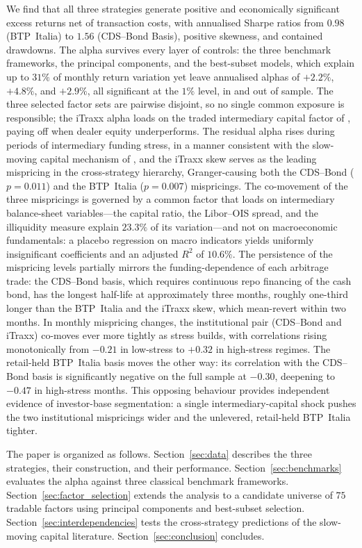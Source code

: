 We find that all three strategies generate positive and economically
significant excess returns net of transaction costs, with annualised
Sharpe ratios from $0.98$ (BTP~Italia) to $1.56$ (CDS--Bond Basis),
positive skewness, and contained drawdowns. The alpha survives every
layer of controls: the three benchmark frameworks, the principal
components, and the best-subset models, which explain up to $31\%$ of
monthly return variation yet leave annualised alphas of $+2.2\%$,
$+4.8\%$, and $+2.9\%$, all significant at the $1\%$ level, in and
out of sample. The three selected factor sets are pairwise disjoint,
so no single common exposure is responsible; the iTraxx alpha loads
on the traded intermediary capital factor of
\citet{he2017intermediary}, paying off when dealer equity
underperforms. The residual alpha rises during periods of
intermediary funding stress, in a manner consistent with the
slow-moving capital mechanism of \citet{duffie2010presidential}, and
the iTraxx skew serves as the leading mispricing in the
cross-strategy hierarchy, Granger-causing both the CDS--Bond
($p=0.011$) and the BTP~Italia ($p=0.007$) mispricings. The
co-movement of the three mispricings is governed by a common factor
that loads on intermediary balance-sheet variables---the
\citet{he2017intermediary} capital ratio, the Libor--OIS spread, and
the \citet{amihud2015pricing} illiquidity measure explain $23.3\%$ of
its variation---and not on macroeconomic fundamentals: a placebo
regression on macro indicators yields uniformly insignificant
coefficients and an adjusted $R^{2}$ of $10.6\%$. The persistence of
the mispricing levels partially mirrors the funding-dependence of
each arbitrage trade: the CDS--Bond basis, which requires continuous
repo financing of the cash bond, has the longest half-life at
approximately three months, roughly one-third longer than the
BTP~Italia and the iTraxx skew, which mean-revert within two months. In monthly mispricing
changes, the institutional pair (CDS--Bond and iTraxx) co-moves ever
more tightly as stress builds, with correlations rising monotonically
from $-0.21$ in low-stress to $+0.32$ in high-stress regimes. The
retail-held BTP~Italia basis moves the other way: its correlation
with the CDS--Bond basis is significantly negative on the full sample
at $-0.30$, deepening to $-0.47$ in high-stress months. This opposing
behaviour provides independent evidence of investor-base
segmentation: a single intermediary-capital shock pushes the two
institutional mispricings wider and the unlevered, retail-held
BTP~Italia tighter.

The paper is organized as follows.
Section~\ref{sec:data} describes the three strategies, their
construction, and their performance.
Section~\ref{sec:benchmarks} evaluates the alpha against three
classical benchmark frameworks. Section~\ref{sec:factor_selection}
extends the analysis to a candidate universe of $75$ tradable factors
using principal components and best-subset selection.
Section~\ref{sec:interdependencies} tests the cross-strategy
predictions of the slow-moving capital literature.
Section~\ref{sec:conclusion} concludes.